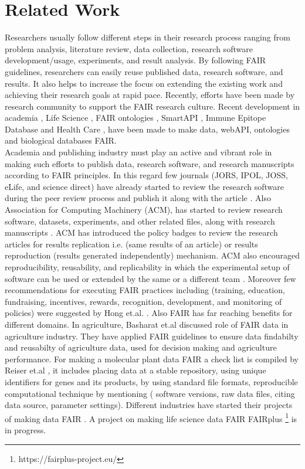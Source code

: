 \documentclass[preprint,12pt]{elsarticle}
\begin{document}
\section{Related Work} \label{sec:Related Work}
Researchers usually follow different steps in their research process ranging from problem analysis, literature review, data collection, research software development/usage, experiments, and result analysis. By following FAIR guidelines, researchers can easily reuse published data, research software, and results. It also helps to increase the focus on extending the existing work and achieving their research goals at rapid pace. Recently, efforts have been made by research community to support the FAIR research culture. Recent development in academia \cite{wilkinson2016FAIR}, Life Science \cite{vogt2019FAIR}, FAIR ontologies \cite{guizzardi2020ontology},  SmartAPI \cite{vita2018FAIR}, Immune Epitope Database \cite{spoor2019tripal} and Health Care \cite{sinaci2020raw}, have been made to make data, webAPI, ontologies and biological databases FAIR.\\

Academia and publishing industry must play an active and vibrant role in making such efforts to publish data, research software, and research manuscripts according to FAIR principles. In this regard few journals (JORS, IPOL, JOSS, eLife, and science direct) have already started to review the research software during the peer review process and publish it along with the article \cite{gruenpeter2020m2}. Also Association for Computing Machinery (ACM), has started to review research software, datasets, experiments, and other related files, along with research manuscripts \cite{krishnamurthi2015real}. ACM has introduced the policy badges to review the research articles for results replication i.e. (same results of an article) or results reproduction (results generated independently) mechanism. ACM also encouraged reproducibility, reusability, and replicability in which the experimental setup of software can be used or extended by the same or a different team \cite{boisvert2016incentivizing}. Moreover few recommendations for executing FAIR practices including (training, education, fundraising, incentives, rewards, recognition, development, and monitoring of policies) were suggested by Hong et.al. \cite{hong2020six}. Also 
FAIR has far reaching benefits for different domains. In  agriculture, Basharat et.al \cite{ali2022role} discussed role of FAIR data in agriculture industry. They have applied FAIR guidelines to ensure data findabilty and reusabilty of agriculture data, used for decision making and agriculture performance. For making a molecular plant data FAIR a check list is compiled by Reiser et.al \cite{reiser2018fair}, it includes placing data at a stable repository, using unique identifiers for genes and its products, by using standard file formats, reproducible computational technique by mentioning ( software versions, raw data files, citing data source, parameter settings). Different industries have started their projects of making data FAIR \cite{van2020need}. A project on making life science data FAIR  FAIRplus \footnote{https://fairplus-project.eu/} is in progress.
\end{document}
